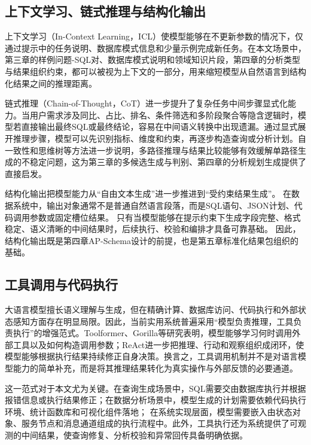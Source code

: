 \subsection{上下文学习、链式推理与结构化输出}

上下文学习（In-Context Learning，ICL）使模型能够在不更新参数的情况下，仅通过提示中的任务说明、数据库模式信息和少量示例完成新任务\cite{brown2020gpt3,dong2023icl_survey}。在本文场景中，第三章的样例问题-SQL对、数据库模式说明和领域知识片段，第四章的分析类型与结果组织约束，都可以被视为上下文的一部分，用来缩短模型从自然语言到结构化结果之间的推理距离。

链式推理（Chain-of-Thought，CoT）进一步提升了复杂任务中间步骤显式化能力\cite{wei2022chain,kojima2022zeroshotcot}。当用户需求涉及同比、占比、排名、条件筛选和多阶段聚合等隐含逻辑时，模型若直接输出最终SQL或最终结论，容易在中间语义转换中出现遗漏。通过显式展开推理步骤，模型可以先识别指标、维度和约束，再逐步构造查询或分析计划。自一致性\cite{wang2023selfconsistency}和思维树\cite{yao2023tot}等方法进一步说明，多路径推理与结果比较能够有效缓解单路径生成的不稳定问题，这为第三章的多候选生成与判别、第四章的分析规划生成提供了直接启发。

结构化输出把模型能力从“自由文本生成”进一步推进到“受约束结果生成”。
在数据系统中，输出对象通常不是普通自然语言段落，而是SQL语句、JSON计划、代码调用参数或固定槽位结果。
只有当模型能够在提示约束下生成字段完整、格式稳定、语义清晰的中间结果时，后续执行、校验和编排才具备可靠基础\cite{tang2024struc}。
因此，结构化输出既是第四章AP-Schema设计的前提，也是第五章标准化结果包组织的基础。


\subsection{工具调用与代码执行}

大语言模型擅长语义理解与生成，但在精确计算、数据库访问、代码执行和外部状态感知方面存在明显局限\cite{qin2024toollearning}。因此，当前实用系统普遍采用“模型负责推理，工具负责执行”的增强范式。Toolformer\cite{schick2024toolformer}、Gorilla\cite{patil2023gorilla}等研究表明，模型能够学习何时调用外部工具以及如何构造调用参数；ReAct\cite{yao2023react}进一步把推理、行动和观察组织成闭环，使模型能够根据执行结果持续修正自身决策。换言之，工具调用机制并不是对语言模型能力的简单补充，而是将其推理结果转化为真实操作与外部反馈的必要通道。

这一范式对于本文尤为关键。在查询生成场景中，SQL需要交由数据库执行并根据报错信息或执行结果修正；在数据分析场景中，模型生成的计划需要依赖代码执行环境、统计函数库和可视化组件落地；
在系统实现层面，模型需要嵌入由状态对象、服务节点和消息通道组成的执行流程中。此外，工具执行还为系统提供了可观测的中间结果，使查询修复、分析校验和异常回传具备明确依据。

